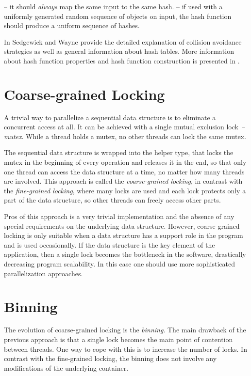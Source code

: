 \begin{block-description}
\blockitem[Determinism]-- it should \emph{always} map the same input to the same hash.
\blockitem[Uniformity]-- if used with a uniformly generated random sequence of objects on input, the hash function should produce a uniform sequence of hashes.
\end{block-description}

In \cite{sedgewick} Sedgewick and Wayne provide the detailed explanation of collision avoidance strategies as well as general information about hash tables. More information about hash function properties and hash function construction is presented in \cite{knott}.

\section{Coarse-grained Locking}

A trivial way to parallelize a sequential data structure is to eliminate a concurrent access at all. It can be achieved with a single mutual exclusion lock~-- \emph{mutex}.
While a thread holds a mutex, no other threads can lock the same mutex.

The sequential data structure is wrapped into the helper type, that locks the mutex in the beginning of every operation and releases it in the end, so that only one thread can access the data structure at a time, no matter how many threads are involved.
This approach is called the \emph{coarse-grained locking}, in contrast with the \emph{fine-grained locking}, where many locks are used and each lock protects only a part of the data structure, so other threads can freely access other parts.

Pros of this approach is a very trivial implementation and the absence of any special requirements on the underlying data structure. However, coarse-grained locking is only suitable when a data structure has a support role in the program and is used occasionally. If the data structure is the key element of the application, then a single lock becomes the bottleneck in the software, drastically decreasing program scalability. In this case one should use more sophisticated parallelization approaches.

\section{Binning}
\label{sec:pre_bin}
The evolution of coarse-grained locking is the \emph{binning}. The main drawback of the previous approach is that a single lock becomes the main point of contention between threads. One way to cope with this is to increase the number of locks. In contrast with the fine-grained locking, the binning does not involve any modifications of the underlying container.

